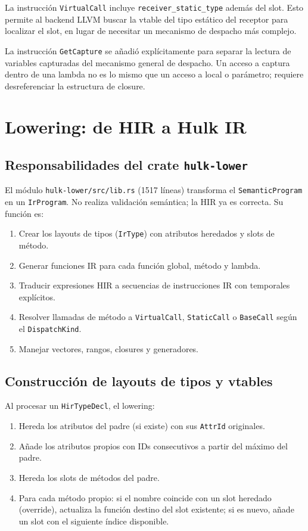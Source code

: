 \documentclass[12pt,letterpaper]{article}
\newcommand{\src}[1]{\texttt{#1}}
\begin{document}
La instrucción \src{VirtualCall} incluye \src{receiver\_static\_type} además del slot. Esto permite al backend LLVM buscar la vtable del tipo estático del receptor para localizar el slot, en lugar de necesitar un mecanismo de despacho más complejo.

La instrucción \src{GetCapture} se añadió explícitamente para separar la lectura de variables capturadas del mecanismo general de despacho. Un acceso a captura dentro de una lambda no es lo mismo que un acceso a local o parámetro; requiere desreferenciar la estructura de closure.

\section{Lowering: de HIR a Hulk IR}

\subsection{Responsabilidades del crate \src{hulk-lower}}

El módulo \src{hulk-lower/src/lib.rs} (1517 líneas) transforma el \src{SemanticProgram} en un \src{IrProgram}. No realiza validación semántica; la HIR ya es correcta. Su función es:

\begin{enumerate}[label=\arabic*.]
    \item Crear los layouts de tipos (\src{IrType}) con atributos heredados y slots de método.
    \item Generar funciones IR para cada función global, método y lambda.
    \item Traducir expresiones HIR a secuencias de instrucciones IR con temporales explícitos.
    \item Resolver llamadas de método a \src{VirtualCall}, \src{StaticCall} o \src{BaseCall} según el \src{DispatchKind}.
    \item Manejar vectores, rangos, closures y generadores.
\end{enumerate}

\subsection{Construcción de layouts de tipos y vtables}

Al procesar un \src{HirTypeDecl}, el lowering:

\begin{enumerate}[label=\arabic*.]
    \item Hereda los atributos del padre (si existe) con sus \src{AttrId} originales.
    \item Añade los atributos propios con IDs consecutivos a partir del máximo del padre.
    \item Hereda los slots de métodos del padre.
    \item Para cada método propio: si el nombre coincide con un slot heredado (override), actualiza la función destino del slot existente; si es nuevo, añade un slot con el siguiente índice disponible.
\end{enumerate}
\end{document}

